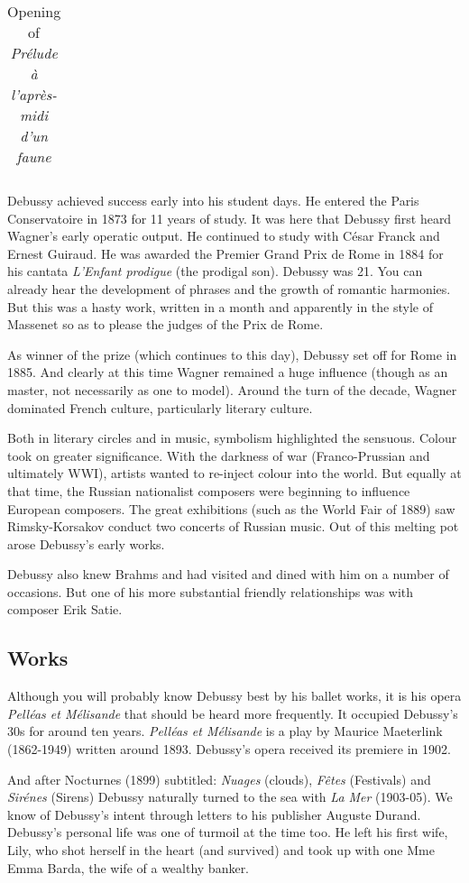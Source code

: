 \begin{table}[h!]
\begin{tabular}{|l|l|}
\hline
\end{tabular}
\caption{Opening of \textit{Pr\'elude \`a l'apr\`es-midi d'un faune}}
\label{tab:faune}
\end{table}

Debussy achieved success early into his student days. He entered the Paris Conservatoire in 1873 for 11 years of study. It was here that Debussy first heard Wagner's early operatic output. He continued to study with C\'esar Franck and Ernest Guiraud. He was awarded the Premier Grand Prix de Rome in 1884 for his cantata \textit{L'Enfant prodigue} (the prodigal son). Debussy was 21. You can already hear the development of phrases and the growth of romantic harmonies. But this was a hasty work, written in a month and apparently in the style of Massenet so as to please the judges of the Prix de Rome. 

As winner of the prize (which continues to this day), Debussy set off for Rome in 1885. And clearly at this time Wagner remained a huge influence (though as an master, not necessarily as one to model). Around the turn of the decade, Wagner dominated French culture, particularly literary culture.

Both in literary circles and in music, symbolism highlighted the sensuous. Colour took on greater significance. With the darkness of war (Franco-Prussian and ultimately WWI), artists wanted to re-inject colour into the world. But equally at that time, the Russian nationalist composers were beginning to influence European composers. The great exhibitions (such as the World Fair of 1889) saw Rimsky-Korsakov conduct two concerts of Russian music. Out of this melting pot arose Debussy's early works. 

Debussy also knew Brahms and had visited and dined with him on a number of occasions. But one of his more substantial friendly relationships was with composer Erik Satie.

\subsection{Works}
Although you will probably know Debussy best by his ballet works, it is his opera \textit{Pell\'eas et M\'elisande} that should be heard more frequently. It occupied Debussy's 30s for around ten years. \textit{Pell\'eas et M\'elisande} is a play by Maurice Maeterlink (1862-1949) written around 1893. Debussy's opera received its premiere in 1902. 

And after Nocturnes (1899) subtitled: \textit{Nuages} (clouds), \textit{F\^etes} (Festivals) and \textit{Sir\'enes} (Sirens) Debussy naturally turned to the sea with \textit{La Mer} (1903-05). We know of Debussy's intent through letters to his publisher Auguste Durand. Debussy's personal life was one of turmoil at the time too. He left his first wife, Lily, who shot herself in the heart (and survived) and took up with one Mme Emma Barda, the wife of a wealthy banker. 


